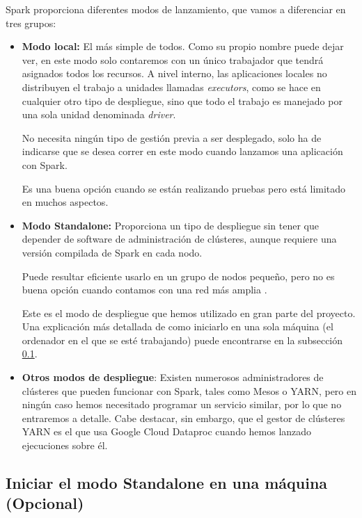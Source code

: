 Spark proporciona diferentes modos de lanzamiento, que vamos a diferenciar en tres grupos:

\begin{itemize}
	\item \textbf{Modo local:} El más simple de todos. Como su propio nombre puede dejar ver, en este modo solo contaremos con un único trabajador que tendrá asignados todos los recursos. A nivel interno, las aplicaciones locales no distribuyen el trabajo a unidades llamadas \textit{executors}, como se hace en cualquier otro tipo de despliegue, sino que todo el trabajo es manejado por una sola unidad denominada \textit{driver}.
	
	No necesita ningún tipo de gestión previa a ser desplegado, solo ha de indicarse que se desea correr en este modo cuando lanzamos una aplicación con Spark.
	
	Es una buena opción cuando se están realizando pruebas pero está limitado en muchos aspectos.
	
	\item \textbf{Modo Standalone:} Proporciona un tipo de despliegue sin tener que depender de software de administración de clústeres, aunque requiere una versión compilada de Spark en cada nodo.
	
	Puede resultar eficiente usarlo en un grupo de nodos pequeño, pero no es buena opción cuando contamos con una red más amplia \cite{karau2015learning}.
	
	Este es el modo de despliegue que hemos utilizado en gran parte del proyecto. Una explicación más detallada de como iniciarlo en una sola máquina (el ordenador en el que se esté trabajando) puede encontrarse en la subsección \ref{subsec:startStandalone}.
	
	\item \textbf{Otros modos de despliegue}: Existen numerosos administradores de clústeres que pueden funcionar con Spark, tales como Mesos o YARN, pero en ningún caso hemos necesitado programar un servicio similar, por lo que no entraremos a detalle. Cabe destacar, sin embargo, que el gestor de clústeres YARN es el que usa Google Cloud Dataproc cuando hemos lanzado ejecuciones sobre él.
\end{itemize}

\subsection{Iniciar el modo Standalone en una máquina (Opcional)}\label{subsec:startStandalone}

